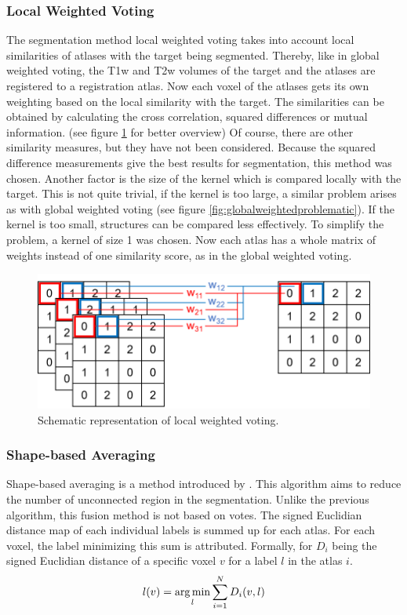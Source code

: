 \subsubsection*{Local Weighted Voting}
The segmentation method local weighted voting takes into account local similarities of atlases with the target being segmented. Thereby, like in global weighted voting, the T1w and T2w volumes of the target and the atlases are registered to a registration atlas. Now each voxel of the atlases gets its own weighting based on the local similarity with the target. The similarities can be obtained by calculating the cross correlation, squared differences or mutual information. (see figure \ref{fig:localWeightedVoting} for better overview) Of course, there are other similarity measures, but they have not been considered. Because the squared difference measurements give the best results for segmentation, this method was chosen\cite{Artaechevarria2009}. Another factor is the size of the kernel which is compared locally with the target. This is not quite trivial, if the kernel is too large, a similar problem arises as with global weighted voting (see figure \ref{fig:globalweightedproblematic}). If the kernel is too small, structures can be compared less effectively. To simplify the problem, a kernel of size 1 was chosen. Now each atlas has a whole matrix of weights instead of one similarity score, as in the global weighted voting.

\begin{figure}[h!]
	\centering
	\includegraphics[width=0.8\linewidth]{img/localWeighting}
	\caption{Schematic representation of local weighted voting.}
	\label{fig:localWeightedVoting}
\end{figure}

\subsubsection*{Shape-based Averaging}
Shape-based averaging is a method introduced by \cite{Rohlfing2007}. This algorithm aims to reduce the number of unconnected region in the segmentation. Unlike the previous algorithm, this fusion method is not based on votes. The signed Euclidian distance map of each individual labels is summed up for each atlas. For each voxel, the label minimizing this sum is attributed. Formally, for $D_i$ being the signed Euclidian distance of a specific voxel $v$ for a label $l$ in the atlas $i$.
\[ l(v) = \operatorname*{arg\,min}_l\sum_{i=1}^{N} D_i(v, l) \]

